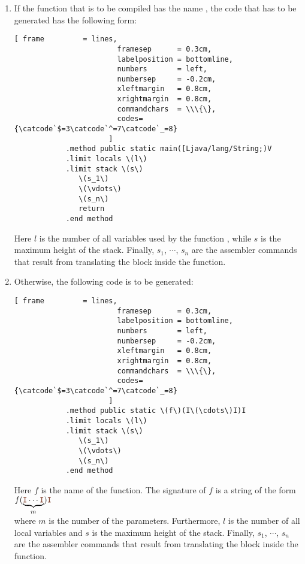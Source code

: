 \begin{enumerate}
\item If the function that  is to be compiled has the name , the code that has to be generated
      has the following form:

      \begin{Verbatim}[ frame         = lines, 
                        framesep      = 0.3cm, 
                        labelposition = bottomline,
                        numbers       = left,
                        numbersep     = -0.2cm,
                        xleftmargin   = 0.8cm,
                        xrightmargin  = 0.8cm,
                        commandchars  = \\\{\},
                        codes={\catcode`$=3\catcode`^=7\catcode`_=8}
                      ]
            .method public static main([Ljava/lang/String;)V
            .limit locals \(l\) 
            .limit stack \(s\)
               \(s_1\)
               \(\vdots\)
               \(s_n\)
               return
            .end method
       \end{Verbatim}

       Here $l$ is the number of all variables used by the function , while $s$ is the maximum
       height of the stack.
       Finally,  $s_1$, $\cdots$, $s_n$ are the assembler commands that result from translating the block
       inside the function.
\pagebreak
       
\item Otherwise, the following code is to be generated:

      \begin{Verbatim}[ frame         = lines, 
                        framesep      = 0.3cm, 
                        labelposition = bottomline,
                        numbers       = left,
                        numbersep     = -0.2cm,
                        xleftmargin   = 0.8cm,
                        xrightmargin  = 0.8cm,
                        commandchars  = \\\{\},
                        codes={\catcode`$=3\catcode`^=7\catcode`_=8}
                      ]
            .method public static \(f\)(I\(\cdots\)I)I
            .limit locals \(l\) 
            .limit stack \(s\)
               \(s_1\)
               \(\vdots\)
               \(s_n\)
            .end method
       \end{Verbatim}
       
       Here $f$ is the name of the function.  The signature of $f$ is a string of the form
       \\[0.2cm]
       \hspace*{1.3cm}
       $f(\underbrace{\mytt{I}\cdots\mytt{I}}_{m})\mytt{I}$
       \\[0.2cm]
       where $m$ is the number of the parameters.  Furthermore, 
       $l$ is the number of all local variables and  $s$
       is the maximum height of the stack.  Finally,
       $s_1$, $\cdots$, $s_n$ are the assembler commands that result from translating the block inside the function.
\end{enumerate}
